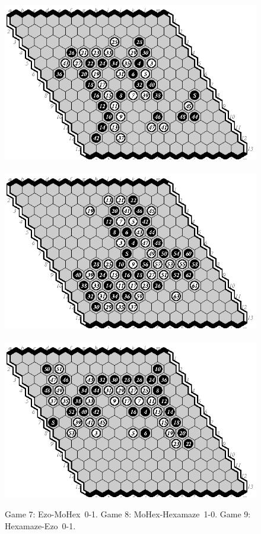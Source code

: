 \documentclass{icga}
\def\Eo{\mbox{\sc Ezo}}
\def\Hz{\mbox{\sc Hexamaze}}
\def\Mx{\mbox{\sc MoHex}}
\begin{document}
\begin{figure}[hbp]
\hspace*{-2cm}\
\includegraphics[scale=1.1]{games/pix/13-07-em-0-1.eps}\hspace*{-2cm}\
\includegraphics[scale=1.1]{games/pix/13-08-mh-1-0.eps}\hspace*{-2cm}\
\includegraphics[scale=1.1]{games/pix/13-09-he-0-1.eps}
\caption{Game 7: \Eo-\Mx\ 0-1. Game 8: \Mx-\Hz\ 1-0. Game 9: \Hz-\Eo\ 0-1.}
\end{figure}
\end{document}
